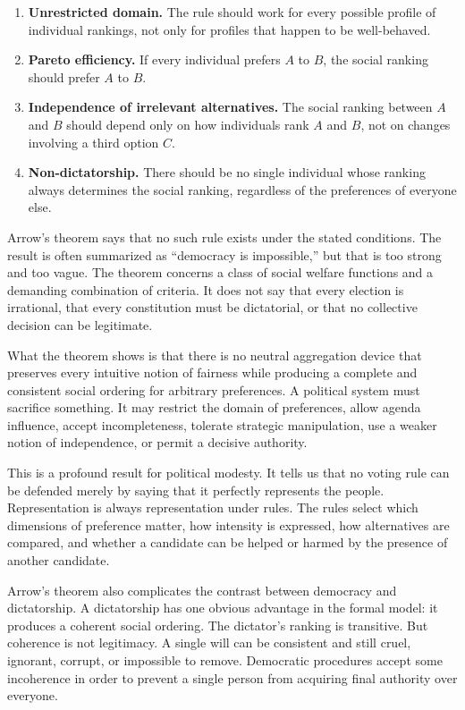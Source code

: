 ﻿\documentclass[12pt,a4paper]{book}
\begin{document}
\begin{enumerate}
\item \textbf{Unrestricted domain.}  The rule should work for every possible
profile of individual rankings, not only for profiles that happen to be
well-behaved.
\item \textbf{Pareto efficiency.}  If every individual prefers $A$ to $B$,
the social ranking should prefer $A$ to $B$.
\item \textbf{Independence of irrelevant alternatives.}  The social ranking
between $A$ and $B$ should depend only on how individuals rank $A$ and $B$,
not on changes involving a third option $C$.
\item \textbf{Non-dictatorship.}  There should be no single individual whose
ranking always determines the social ranking, regardless of the preferences
of everyone else.
\end{enumerate}

Arrow's theorem says that no such rule exists under the stated conditions.
The result is often summarized as ``democracy is impossible,'' but that is
too strong and too vague.  The theorem concerns a class of social welfare
functions and a demanding combination of criteria.  It does not say that
every election is irrational, that every constitution must be dictatorial,
or that no collective decision can be legitimate.

What the theorem shows is that there is no neutral aggregation device that
preserves every intuitive notion of fairness while producing a complete and
consistent social ordering for arbitrary preferences.  A political system
must sacrifice something.  It may restrict the domain of preferences, allow
agenda influence, accept incompleteness, tolerate strategic manipulation,
use a weaker notion of independence, or permit a decisive authority.

This is a profound result for political modesty.  It tells us that no voting
rule can be defended merely by saying that it perfectly represents the
people.  Representation is always representation under rules.  The rules
select which dimensions of preference matter, how intensity is expressed,
how alternatives are compared, and whether a candidate can be helped or
harmed by the presence of another candidate.

Arrow's theorem also complicates the contrast between democracy and
dictatorship.  A dictatorship has one obvious advantage in the formal model:
it produces a coherent social ordering.  The dictator's ranking is
transitive.  But coherence is not legitimacy.  A single will can be
consistent and still cruel, ignorant, corrupt, or impossible to remove.
Democratic procedures accept some incoherence in order to prevent a single
person from acquiring final authority over everyone.
\end{document}
